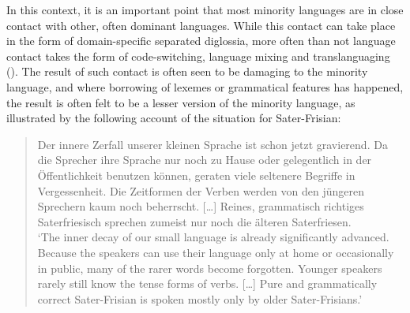 \documentclass[output=paper]{langsci/langscibook}
\begin{document}
In this context, it is an important point that most minority languages are in close contact with other, often dominant languages. While this contact can take place in the form of domain-specific separated diglossia, more often than not language contact takes the form of code-switching, language mixing and translanguaging (\citealt{GarciaWei2014}). The result of such contact is often seen to be damaging to the minority language, and where borrowing of lexemes or grammatical features has happened, the result is often felt to be a lesser version of the minority language, as illustrated by the following account of the situation for Sater-Frisian: 

\begin{quote}
Der innere Zerfall unserer kleinen Sprache ist schon jetzt gravierend. Da die Sprecher ihre Sprache nur noch zu Hause oder gelegentlich in der Öffentlichkeit benutzen können, geraten viele seltenere Begriffe in Vergessenheit. Die Zeitformen der Verben werden von den jüngeren Sprechern kaum noch beherrscht. […] Reines, grammatisch richtiges Saterfriesisch sprechen zumeist nur noch die älteren Saterfriesen. \citep[56]{EversSchramm2009}\smallskip\\\relax
‘The inner decay of our small language is already significantly advanced. Because the speakers can use their language only at home or occasionally in public, many of the rarer words become forgotten. Younger speakers rarely still know the tense forms of verbs. […] Pure and grammatically correct Sater-Frisian is spoken mostly only by older Sater-Frisians.’
\end{quote}
\end{document}
